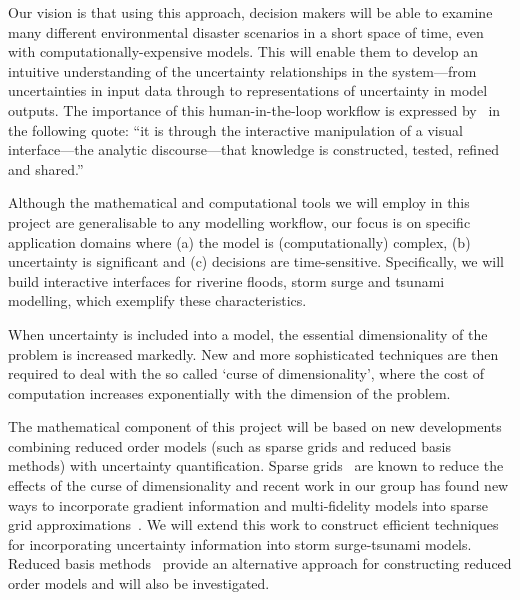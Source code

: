Our vision is that using this approach, decision makers will be able
to examine many different environmental disaster scenarios in a short
space of time, even with computationally-expensive models. This will
enable them to develop an intuitive understanding of the uncertainty
relationships in the system---from uncertainties in input data through
to representations of uncertainty in model outputs. The importance of
this human-in-the-loop workflow is expressed by~\cite{pikeScience2009}
in the following quote: ``it is through the interactive manipulation
of a visual interface---the analytic discourse---that knowledge is
constructed, tested, refined and shared.''

Although the mathematical and computational tools we will employ in
this project are generalisable to any modelling workflow, our focus is
on specific application domains where (a) the model is
(computationally) complex, (b) uncertainty is significant and (c)
decisions are time-sensitive. Specifically, we will build interactive
interfaces for riverine floods, storm surge and tsunami modelling,
which exemplify these characteristics.

When uncertainty is included into a model, the 
essential dimensionality of the problem is increased markedly.  
New and more sophisticated techniques are then required to deal with the so called
`curse of dimensionality', where
the cost of computation increases exponentially with the dimension of
the problem. 

The mathematical component of this project will be based on new
developments combining reduced order models 
(such as sparse grids and reduced basis methods)
with uncertainty quantification.
Sparse grids~\parencite{BungartzGriebel2004} are known to
reduce the effects of the curse of dimensionality and 
recent work in our group has found new ways to incorporate gradient
information and multi-fidelity models into sparse grid
approximations~\parencite{deBaarHarding2015,Jakeman2015,deBaarRDM2015}.
We will extend this work to construct efficient techniques 
for incorporating uncertainty  information into 
storm surge-tsunami models. 
Reduced basis 
methods~\parencite{quarteroni2015reduced} provide an 
alternative approach for constructing reduced order 
models and will also be investigated.

